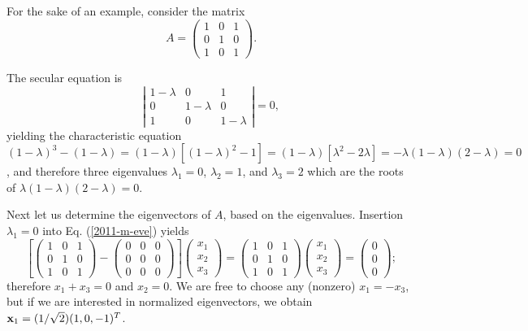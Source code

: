 {\color{blue}
\bexample
For the sake of an example, consider  the
{matrix}
\begin{equation}
A=
\begin{pmatrix}
1&0&1\\
0&1&0\\
1&0&1
\end{pmatrix}.
\end{equation}

The secular equation is
$$
\left|
\begin{matrix}
1-\lambda &0&1\\
0&1-\lambda &0\\
1&0&1-\lambda
\end{matrix}
\right| = 0,
$$
yielding the characteristic equation
$
(1-\lambda )^3 -(1-\lambda ) =(1-\lambda )[(1-\lambda )^2 - 1]=(1-\lambda )[\lambda ^2 - 2\lambda ]= - \lambda (1-\lambda )(2-\lambda ) =0$,
and therefore three  eigenvalues
$\lambda_1=0$,
$\lambda_2=1$, and
$\lambda_3=2$ which are the roots of $\lambda (1-\lambda )(2-\lambda ) =0$.

Next let us determine the eigenvectors of $A$, based on the eigenvalues.
Insertion  $\lambda_1=0$ into Eq. (\ref{2011-m-eve}) yields
\begin{equation}
\left[
\begin{pmatrix}
1&0&1\\
0&1&0\\
1&0&1
\end{pmatrix}  -
\begin{pmatrix}
0&0&0\\
0&0&0\\
0&0&0
\end{pmatrix}
\right]
\begin{pmatrix}
x_1\\
x_2\\
x_3
\end{pmatrix}
=
\begin{pmatrix}
1&0&1\\
0&1&0\\
1&0&1
\end{pmatrix}
\begin{pmatrix}
x_1\\
x_2\\
x_3
\end{pmatrix}
=
\begin{pmatrix}
0\\
0\\
0
\end{pmatrix}
;
\end{equation}
therefore $x_1+x_3=0$ and $x_2=0$.
We are free to choose any (nonzero) $x_1=-x_3$,
but if we are interested in normalized eigenvectors, we obtain
${\bf x}_1 =(1/\sqrt{2})(1,0,-1)^T$.

}
